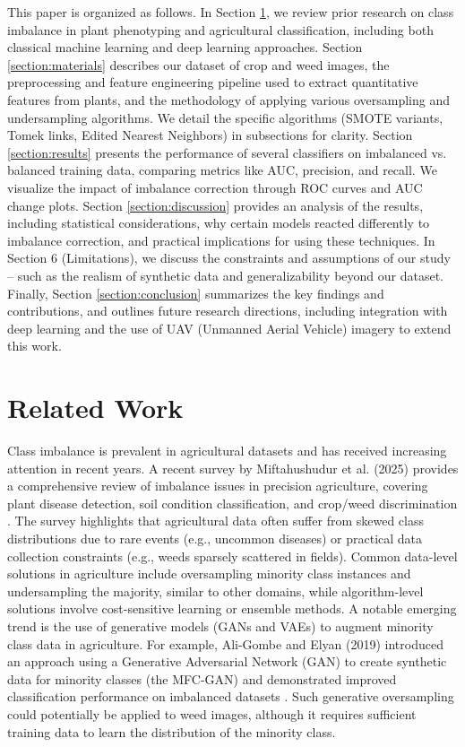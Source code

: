 \documentclass[agriengineering,article,submit,pdftex,moreauthors]{Definitions/mdpi}
\begin{document}
%
This paper is organized as follows. In Section \ref{section:related}, we review prior research on class imbalance in plant phenotyping and agricultural classification, including both classical machine learning and deep learning approaches. Section \ref{section:materials} describes our dataset of crop and weed images, the preprocessing and feature engineering pipeline used to extract quantitative features from plants, and the methodology of applying various oversampling and undersampling algorithms. We detail the specific algorithms (SMOTE variants, Tomek links, Edited Nearest Neighbors) in subsections for clarity. Section \ref{section:results} presents the performance of several classifiers on imbalanced vs. balanced training data, comparing metrics like AUC, precision, and recall. We visualize the impact of imbalance correction through ROC curves and AUC change plots. Section \ref{section:discussion} provides an analysis of the results, including statistical considerations, why certain models reacted differently to imbalance correction, and practical implications for using these techniques. In Section 6 (Limitations), we discuss the constraints and assumptions of our study – such as the realism of synthetic data and generalizability beyond our dataset. Finally, Section \ref{section:conclusion} summarizes the key findings and contributions, and outlines future research directions, including integration with deep learning and the use of UAV (Unmanned Aerial Vehicle) imagery to extend this work.
%
\section{Related Work}
\label{section:related}
Class imbalance is prevalent in agricultural datasets and has received increasing attention in recent years.  A recent survey by Miftahushudur et al. (2025) provides a comprehensive review of imbalance issues in precision agriculture, covering plant disease detection, soil condition classification, and crop/weed discrimination \cite{Miftahushudur2025-dc}. The survey highlights that agricultural data often suffer from skewed class distributions due to rare events (e.g., uncommon diseases) or practical data collection constraints (e.g., weeds sparsely scattered in fields). Common data-level solutions in agriculture include oversampling minority class instances and undersampling the majority, similar to other domains, while algorithm-level solutions involve cost-sensitive learning or ensemble methods.  A notable emerging trend is the use of generative models (GANs and VAEs) to augment minority class data in agriculture.  For example, Ali-Gombe and Elyan (2019) introduced an approach using a Generative Adversarial Network (GAN) to create synthetic data for minority classes (the MFC-GAN) and demonstrated improved classification performance on imbalanced datasets \cite{Ali-Gombe2019-kr, Miftahushudur2025-dc}. Such generative oversampling could potentially be applied to weed images, although it requires sufficient training data to learn the distribution of the minority class.
\end{document}
